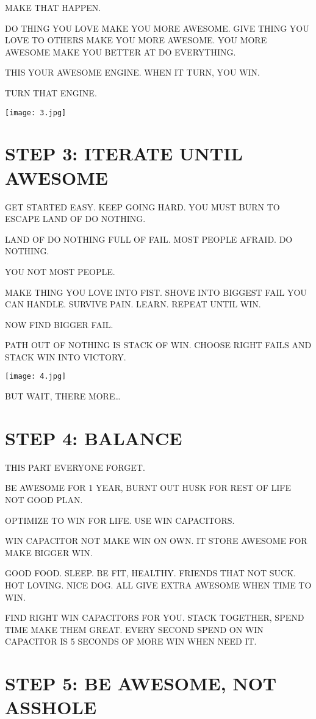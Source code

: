 \documentclass{article}
\begin{document}
MAKE THAT HAPPEN.

DO THING YOU LOVE MAKE YOU MORE AWESOME. GIVE THING YOU LOVE TO OTHERS
MAKE YOU MORE AWESOME. YOU MORE AWESOME MAKE YOU BETTER AT DO
EVERYTHING.

THIS YOUR AWESOME ENGINE. WHEN IT TURN, YOU WIN.

TURN THAT ENGINE.

\texttt{[image: 3.jpg]}

\section*{STEP 3: ITERATE UNTIL AWESOME}

GET STARTED EASY. KEEP GOING HARD. YOU MUST BURN TO ESCAPE LAND OF DO
NOTHING.

LAND OF DO NOTHING FULL OF FAIL. MOST PEOPLE AFRAID. DO NOTHING.

YOU NOT MOST PEOPLE.

MAKE THING YOU LOVE INTO FIST. SHOVE INTO BIGGEST FAIL YOU CAN HANDLE.
SURVIVE PAIN. LEARN. REPEAT UNTIL WIN.

NOW FIND BIGGER FAIL.

PATH OUT OF NOTHING IS STACK OF WIN. CHOOSE RIGHT FAILS AND STACK WIN
INTO VICTORY.

\texttt{[image: 4.jpg]}

BUT WAIT, THERE MORE\ldots{}

\section*{STEP 4: BALANCE}

THIS PART EVERYONE FORGET.

BE AWESOME FOR 1 YEAR, BURNT OUT HUSK FOR REST OF LIFE NOT GOOD PLAN.

OPTIMIZE TO WIN FOR LIFE. USE WIN CAPACITORS.

WIN CAPACITOR NOT MAKE WIN ON OWN. IT STORE AWESOME FOR MAKE BIGGER
WIN.

GOOD FOOD. SLEEP. BE FIT, HEALTHY. FRIENDS THAT NOT SUCK. HOT LOVING.
NICE DOG. ALL GIVE EXTRA AWESOME WHEN TIME TO WIN.

FIND RIGHT WIN CAPACITORS FOR YOU. STACK TOGETHER, SPEND TIME MAKE
THEM GREAT. EVERY SECOND SPEND ON WIN CAPACITOR IS 5 SECONDS OF MORE
WIN WHEN NEED IT.

\section*{STEP 5: BE AWESOME, NOT ASSHOLE}
\end{document}
